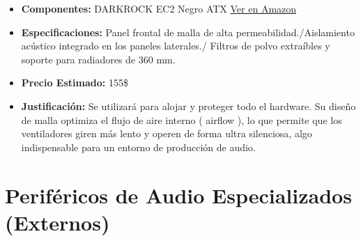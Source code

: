 \documentclass[12pt,a4paper]{article}
\begin{document}
\begin{itemize}
    \item \textbf{Componentes:} DARKROCK EC2 Negro ATX 
    \href{https://www.amazon.com/-/es/darkFlash-Full-Tower-Panor%C3%A1mico-Radiadores-DY470/dp/B0DHWRKXS6/ref=sr_1_12?__mk_es_US=%C3%85M%C3%85%C5%BD%C3%95%C3%91&dib=eyJ2IjoiMSJ9.3a9blhtBS72yD0HI7mnKvffbOuOQ1d-LuYTr5fMU7IZHeqPkqCnKdvnX9fozpnnbGYMxKKv_jrpBJtUFIBWcbxgb7HhLrm1bb1mV3b7-jmlMv5tm93ua0Az_KRnCfGMMPtns6M4elOu6H3fQ6AzEK2XBsUHulg3pt_u9DsVyLWR4UGnKZFfuhYvXOsNdsNVU2UIosPj1QEUSwdFJ0N29PSVA53M6bQOfNk_C_lPsjv4.OMkAsaQOem0euyL1tmtpuv29TVCUvK5hxL-v22EB-G8&dib_tag=se&keywords=chasis%2Bpara%2Bpc%2B360mm&qid=1779563062&sr=8-12&th=1}{Ver en Amazon}
    \item \textbf{Especificaciones:} Panel frontal de malla de alta permeabilidad./Aislamiento acústico integrado en los paneles laterales./ Filtros de polvo extraíbles y soporte para radiadores de 360 mm.
    \item \textbf{Precio Estimado:} 155\$
    \item \textbf{Justificación:} Se utilizará para alojar y proteger todo el hardware. Su diseño de malla optimiza el flujo de aire interno ( airflow ), lo que permite que los ventiladores giren más lento y operen de forma ultra silenciosa, algo indispensable para un entorno de producción de audio.
\end{itemize}

\section{Periféricos de Audio Especializados (Externos)}
\end{document}
